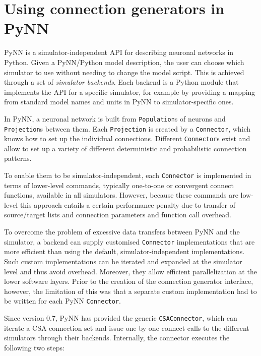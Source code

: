\documentclass{frontiersSCNS} %
\begin{document}

\section{Using connection generators in PyNN}\label{sec:conn_gen_pynn}

PyNN \citep[\url{http://www.neuralensemble.org/PyNN};][]{Davison09} is
a simulator-independent API for
describing neuronal networks in Python. Given a PyNN/Python model
description, the user can choose which simulator to use without needing
to change the model script. This is achieved through a set of
\emph{simulator backends}.
Each backend is a Python module that implements the API
for a specific simulator, for example by providing a mapping from standard
model names and units in PyNN to simulator-specific ones.

In PyNN, a neuronal network is built from \verb|Population|s of
neurons and \verb|Projection|s between them. Each \verb|Projection| is
created by a \verb|Connector|, which knows how to set up the
individual connections. Different \verb|Connector|s exist and allow to
set up a variety of different deterministic and probabilistic
connection patterns. 

To enable them to be simulator-independent, each \verb|Connector| is
implemented in terms of lower-level commands, typically one-to-one or
convergent connect functions, available in all simulators.  However,
because these commands are low-level this approach entails a certain
performance penalty due to transfer of source/target lists and
connection parameters and function call overhead.

To overcome the problem of excessive data transfers between PyNN and
the simulator, a backend can supply customised \verb|Connector|
implementations that are more efficient than using the default,
simulator-independent implementations.  Such custom implementations
can be iterated and expanded at the simulator level and thus avoid
overhead. Moreover, they allow efficient parallelization at the lower
software layers.  Prior to the creation of the connection generator
interface, however, the limitation of this was that a separate custom
implementation had to be written for each PyNN \verb|Connector|.

Since version 0.7, PyNN has provided the generic \verb|CSAConnector|,
which can iterate a CSA connection set and issue one by one connect
calls to the different simulators through their backends. Internally,
the connector executes the following two steps:
\end{document}
